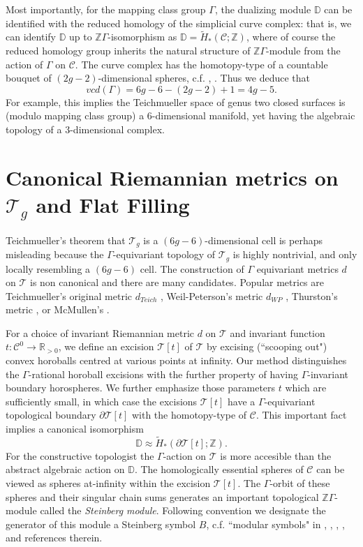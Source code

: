 \documentclass[12pt]{amsart}
\theoremstyle{definition}
\theoremstyle{remark}
\newcommand{\bR}{\mathbb{R}}
\newcommand{\bZ}{\mathbb{Z}}
\newcommand{\del}{\partial}
\newcommand{\bD}{\mathbb{D}}
\newcommand{\sC}{\mathscr{C}}
\newcommand{\sT}{\mathscr{T}}
\begin{document}
Most importantly, for the mapping class group $\Gamma$, the dualizing module $\bD$ can be identified with the reduced homology of the simplicial curve complex: that is, we can identify $\bD$ up to $\bZ\Gamma$-isomorphism as $\bD=\tilde{H}_*(\sC;\bZ)$, where of course the reduced homology group inherits the natural structure of $\bZ \Gamma$-module from the action of $\Gamma$ on $\sC$. The curve complex has the homotopy-type of a countable bouquet of $(2g-2)$-dimensional spheres, c.f. \cite{ivanov2015virtual}, \cite{Harer1986}. Thus we deduce that $$vcd(\Gamma)=6g-6-(2g-2)+1=4g-5.$$ For example, this implies the Teichmueller space of genus two closed surfaces is (modulo mapping class group) a $6$-dimensional manifold, yet having the algebraic topology of a $3$-dimensional complex.  


\section{Canonical Riemannian metrics on $\sT_g$ and Flat Filling}\label{s2}

Teichmueller's theorem that $\sT_g$ is a $(6g-6)$-dimensional cell is perhaps misleading because the $\Gamma$-equivariant topology of $\sT_g$ is highly nontrivial, and only locally resembling a $(6g-6)$ cell. The construction of $\Gamma$ equivariant metrics $d$ on $\sT$ is non canonical and there are many candidates. Popular metrics are Teichmueller's original metric $d_{Teich}$ \cite{hubbard},  Weil-Peterson's metric $d_{WP}$ \cite{hubbard}, Thurston's metric \cite{wolpert1986a}, or McMullen's \cite{mcmullen2000moduli}. 

For a choice of invariant Riemannian metric $d$ on $\sT$ and invariant function $t: \sC^0 \to \bR_{>0}$, we define an excision $\sT[t]$ of $\sT$ by excising (``scooping out") convex horoballs centred at various points at infinity. Our method distinguishes the $\Gamma$-rational horoball excisions with the further property of having $\Gamma$-invariant boundary horospheres. We further emphasize those parameters $t$ which are sufficiently small, in which case the excisions $\sT[t]$  have a $\Gamma$-equivariant topological boundary $\del \sT[t]$ with the homotopy-type of $\sC$. This important fact implies a canonical isomorphism $$\bD\approx \tilde{H}_*(\del \sT[t]; \bZ).$$ For the constructive topologist the $\Gamma$-action on $\sT$ is more accesible than the abstract algebraic action on $\bD$. The homologically essential spheres of $\sC$ can be viewed as spheres at-infinity within the excision $\sT[t]$. The $\Gamma$-orbit of these spheres and their singular chain sums generates an important topological $\bZ \Gamma$-module called the \emph{Steinberg module}. Following convention we designate the generator of this module a Steinberg symbol $B$, c.f. ``modular symbols" in \cite{AR}, \cite{AGM}, \cite{Stein}, \cite{Sol}, and references therein. 
\end{document}

